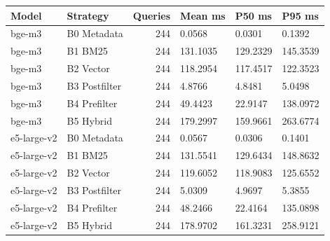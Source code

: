 \begin{tabular}{llrlll}
\toprule
Model & Strategy & Queries & Mean ms & P50 ms & P95 ms \\
\midrule
bge-m3 & B0 Metadata & 244 & 0.0568 & 0.0301 & 0.1392 \\
bge-m3 & B1 BM25 & 244 & 131.1035 & 129.2329 & 145.3539 \\
bge-m3 & B2 Vector & 244 & 118.2954 & 117.4517 & 122.3523 \\
bge-m3 & B3 Postfilter & 244 & 4.8766 & 4.8481 & 5.0498 \\
bge-m3 & B4 Prefilter & 244 & 49.4423 & 22.9147 & 138.0972 \\
bge-m3 & B5 Hybrid & 244 & 179.2997 & 159.9661 & 263.6774 \\
e5-large-v2 & B0 Metadata & 244 & 0.0567 & 0.0306 & 0.1401 \\
e5-large-v2 & B1 BM25 & 244 & 131.5541 & 129.6434 & 148.8632 \\
e5-large-v2 & B2 Vector & 244 & 119.6052 & 118.9083 & 125.6552 \\
e5-large-v2 & B3 Postfilter & 244 & 5.0309 & 4.9697 & 5.3855 \\
e5-large-v2 & B4 Prefilter & 244 & 48.2466 & 22.4164 & 135.0898 \\
e5-large-v2 & B5 Hybrid & 244 & 178.9702 & 161.3231 & 258.9121 \\
\bottomrule
\end{tabular}
